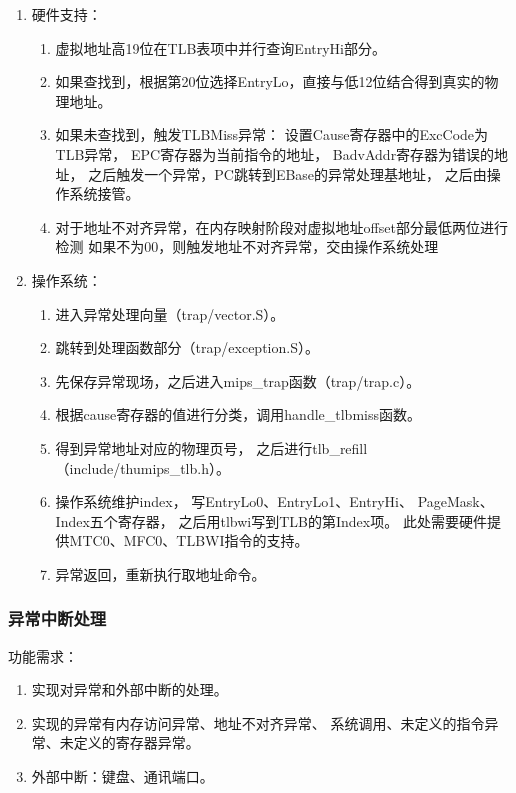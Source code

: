 \begin{enumerate}
            \item
                硬件支持：
                \begin{enumerate}
                \item
                    虚拟地址高19位在TLB表项中并行查询EntryHi部分。
                \item
                    如果查找到，根据第20位选择EntryLo，直接与低12位结合得到真实的物理地址。
                \item
                    如果未查找到，触发TLBMiss异常：%
                    设置Cause寄存器中的ExcCode为TLB异常，%
                    EPC寄存器为当前指令的地址，%
                    BadvAddr寄存器为错误的地址，%
                    之后触发一个异常，PC跳转到EBase的异常处理基地址，%
                    之后由操作系统接管。
                \item
                    对于地址不对齐异常，在内存映射阶段对虚拟地址offset部分最低两位进行检测%
                    如果不为00，则触发地址不对齐异常，交由操作系统处理
                \end{enumerate}
            \item
                操作系统：
                \begin{enumerate}
                \item
                    进入异常处理向量（trap/vector.S）。
                \item
                    跳转到处理函数部分（trap/exception.S）。
                \item
                    先保存异常现场，之后进入mips\_trap函数（trap/trap.c）。
                \item
                    根据cause寄存器的值进行分类，调用handle\_tlbmiss函数。
                \item
                    得到异常地址对应的物理页号，%
                    之后进行tlb\_refill（include/thumips\_tlb.h）。
                \item
                    操作系统维护index，%
                    写EntryLo0、EntryLo1、EntryHi、 PageMask、Index五个寄存器，%
                    之后用tlbwi写到TLB的第Index项。%
                    此处需要硬件提供MTC0、MFC0、TLBWI指令的支持。
                \item
                    异常返回，重新执行取地址命令。%
                \end{enumerate}
            \end{enumerate}

        \subsubsection{异常中断处理}
            功能需求：
            \begin{enumerate}
            \item
            实现对异常和外部中断的处理。
            \item
            实现的异常有内存访问异常、地址不对齐异常、%
            系统调用、未定义的指令异常、未定义的寄存器异常。
            \item
            外部中断：键盘、通讯端口。
            \end{enumerate}

